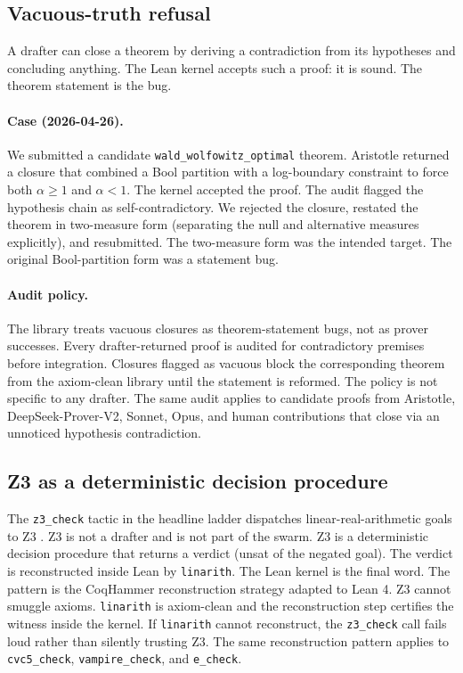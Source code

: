 \subsection{Vacuous-truth refusal}
\label{sec:aristotle-vacuous}

A drafter can close a theorem by deriving a contradiction from
its hypotheses and concluding anything. The Lean kernel accepts
such a proof: it is sound. The theorem statement is the bug.

\paragraph{Case (2026-04-26).}
We submitted a candidate \texttt{wald\_wolfowitz\_optimal}
theorem. Aristotle returned a closure that combined a Bool
partition with a log-boundary constraint to force both
$\alpha \geq 1$ and $\alpha < 1$. The kernel accepted the proof.
The audit flagged the hypothesis chain as self-contradictory.
We rejected the closure, restated the theorem in two-measure
form (separating the null and alternative measures explicitly),
and resubmitted. The two-measure form was the intended target.
The original Bool-partition form was a statement bug.

\paragraph{Audit policy.}
The library treats vacuous closures as theorem-statement bugs,
not as prover successes. Every drafter-returned proof is audited
for contradictory premises before integration. Closures flagged
as vacuous block the corresponding theorem from the axiom-clean
library until the statement is reformed. The policy is not
specific to any drafter. The same audit applies to candidate
proofs from Aristotle, DeepSeek-Prover-V2, Sonnet, Opus, and
human contributions that close via an unnoticed hypothesis
contradiction.

\subsection{Z3 as a deterministic decision procedure}
\label{sec:aristotle-z3}

The \texttt{z3\_check} tactic in the headline ladder dispatches
linear-real-arithmetic goals to Z3 \citep{demoura2008z3}. Z3 is
not a drafter and is not part of the swarm. Z3 is a
deterministic decision procedure that returns a verdict (unsat
of the negated goal). The verdict is reconstructed inside Lean
by \texttt{linarith}. The Lean kernel is the final word. The
pattern is the CoqHammer
\citep{czajkakaliszyk2018coqhammer} reconstruction strategy
adapted to Lean 4. Z3 cannot smuggle axioms. \texttt{linarith}
is axiom-clean and the reconstruction step certifies the
witness inside the kernel. If \texttt{linarith} cannot
reconstruct, the \texttt{z3\_check} call fails loud rather than
silently trusting Z3. The same reconstruction pattern applies
to \texttt{cvc5\_check}, \texttt{vampire\_check}, and
\texttt{e\_check}.

